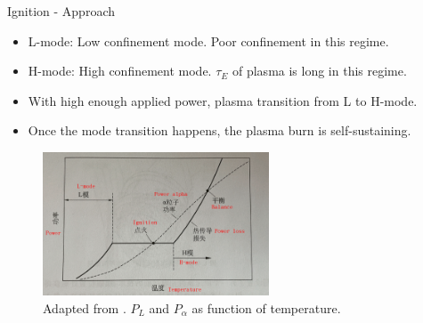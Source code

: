 \begin{frame}{Ignition - Approach}
	\begin{itemize}
		\item L-mode: Low confinement mode. Poor confinement in this regime.
		\item H-mode: High confinement mode. $\tau_E$ of plasma is long in this regime.
		\item With high enough applied power, plasma transition from L to H-mode.
		\item Once the mode transition happens, the plasma burn is self-sustaining.
	\end{itemize}
	\begin{figure}
		\centering
		\includegraphics[width=0.6\textwidth]{figures/ignition-approach.png}
		\caption{Adapted from \cite{wesson_campbell_tokamaks_2011}. $P_L$ and $P_\alpha$ as function of temperature.}
	\end{figure}
\end{frame}